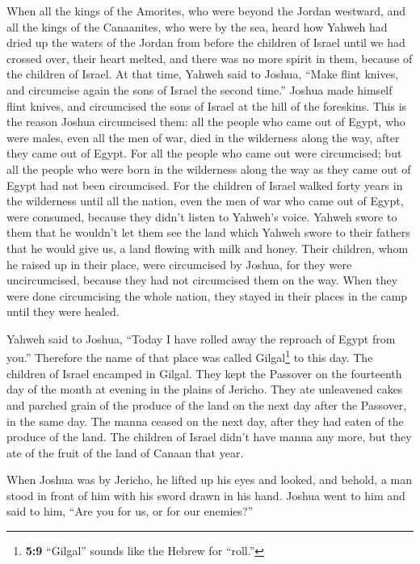  When all the kings of the Amorites, who were beyond the
Jordan westward, and all the kings of the Canaanites, who were by the
sea, heard how Yahweh had dried up the waters of the Jordan from before
the children of Israel until we had crossed over, their heart melted,
and there was no more spirit in them, because of the children of Israel.
 At that time, Yahweh said to Joshua, ``Make flint knives,
and circumcise again the sons of Israel the second time.''
 Joshua made himself flint knives, and circumcised the
sons of Israel at the hill of the foreskins.  This is the
reason Joshua circumcised them: all the people who came out of Egypt,
who were males, even all the men of war, died in the wilderness along
the way, after they came out of Egypt.  For all the people
who came out were circumcised; but all the people who were born in the
wilderness along the way as they came out of Egypt had not been
circumcised.  For the children of Israel walked forty
years in the wilderness until all the nation, even the men of war who
came out of Egypt, were consumed, because they didn't listen to Yahweh's
voice. Yahweh swore to them that he wouldn't let them see the land which
Yahweh swore to their fathers that he would give us, a land flowing with
milk and honey.  Their children, whom he raised up in
their place, were circumcised by Joshua, for they were uncircumcised,
because they had not circumcised them on the way.  When
they were done circumcising the whole nation, they stayed in their
places in the camp until they were healed.

 Yahweh said to Joshua, ``Today I have rolled away the
reproach of Egypt from you.'' Therefore the name of that place was
called Gilgal\footnote{\textbf{5:9} ``Gilgal'' sounds like the Hebrew
  for ``roll.''} to this day.  The children of Israel
encamped in Gilgal. They kept the Passover on the fourteenth day of the
month at evening in the plains of Jericho.  They ate
unleavened cakes and parched grain of the produce of the land on the
next day after the Passover, in the same day.  The manna
ceased on the next day, after they had eaten of the produce of the land.
The children of Israel didn't have manna any more, but they ate of the
fruit of the land of Canaan that year.

 When Joshua was by Jericho, he lifted up his eyes and
looked, and behold, a man stood in front of him with his sword drawn in
his hand. Joshua went to him and said to him, ``Are you for us, or for
our enemies?''

